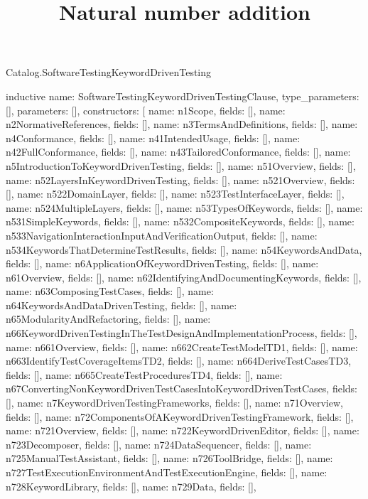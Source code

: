 \begin{lexlean}{Catalog.SoftwareTestingKeywordDrivenTesting}
\title{Natural number addition}
\begin{semanticmodule}
inductive{
  name: SoftwareTestingKeywordDrivenTestingClause,
  type_parameters: [],
  parameters: [],
  constructors: [
    {name: n1Scope, fields: []},
    {name: n2NormativeReferences, fields: []},
    {name: n3TermsAndDefinitions, fields: []},
    {name: n4Conformance, fields: []},
    {name: n41IntendedUsage, fields: []},
    {name: n42FullConformance, fields: []},
    {name: n43TailoredConformance, fields: []},
    {name: n5IntroductionToKeywordDrivenTesting, fields: []},
    {name: n51Overview, fields: []},
    {name: n52LayersInKeywordDrivenTesting, fields: []},
    {name: n521Overview, fields: []},
    {name: n522DomainLayer, fields: []},
    {name: n523TestInterfaceLayer, fields: []},
    {name: n524MultipleLayers, fields: []},
    {name: n53TypesOfKeywords, fields: []},
    {name: n531SimpleKeywords, fields: []},
    {name: n532CompositeKeywords, fields: []},
    {name: n533NavigationInteractionInputAndVerificationOutput, fields: []},
    {name: n534KeywordsThatDetermineTestResults, fields: []},
    {name: n54KeywordsAndData, fields: []},
    {name: n6ApplicationOfKeywordDrivenTesting, fields: []},
    {name: n61Overview, fields: []},
    {name: n62IdentifyingAndDocumentingKeywords, fields: []},
    {name: n63ComposingTestCases, fields: []},
    {name: n64KeywordsAndDataDrivenTesting, fields: []},
    {name: n65ModularityAndRefactoring, fields: []},
    {name: n66KeywordDrivenTestingInTheTestDesignAndImplementationProcess, fields: []},
    {name: n661Overview, fields: []},
    {name: n662CreateTestModelTD1, fields: []},
    {name: n663IdentifyTestCoverageItemsTD2, fields: []},
    {name: n664DeriveTestCasesTD3, fields: []},
    {name: n665CreateTestProceduresTD4, fields: []},
    {name: n67ConvertingNonKeywordDrivenTestCasesIntoKeywordDrivenTestCases, fields: []},
    {name: n7KeywordDrivenTestingFrameworks, fields: []},
    {name: n71Overview, fields: []},
    {name: n72ComponentsOfAKeywordDrivenTestingFramework, fields: []},
    {name: n721Overview, fields: []},
    {name: n722KeywordDrivenEditor, fields: []},
    {name: n723Decomposer, fields: []},
    {name: n724DataSequencer, fields: []},
    {name: n725ManualTestAssistant, fields: []},
    {name: n726ToolBridge, fields: []},
    {name: n727TestExecutionEnvironmentAndTestExecutionEngine, fields: []},
    {name: n728KeywordLibrary, fields: []},
    {name: n729Data, fields: []},
}
\end{semanticmodule}
\end{lexlean}
